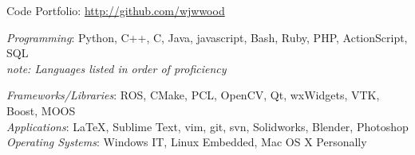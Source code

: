\documentclass[10pt]{article}
\renewcommand{\section}[2]%
        {\pagebreak[2]\vspace{1.3\baselineskip}%
         \phantomsection\addcontentsline{toc}{section}{#1}%
         \hspace{0in}%
         \marginpar{
         \raggedright \scshape #1}#2}
\newcommand{\blankline}{\quad\pagebreak[2]}
\begin{document}
Code Portfolio: \href{http://github.com/wjwwood}{http://github.com/wjwwood}

\blankline

\textit{Programming}: Python, C++, C, Java, javascript, Bash, Ruby, PHP, ActionScript, SQL \\
\null \hfill \textit{note: Languages listed in order of proficiency}

\textit{Frameworks/Libraries}: ROS, CMake, PCL, OpenCV, Qt, wxWidgets, VTK, Boost, MOOS \\


\textit{Applications}: \LaTeX{}, Sublime Text, vim, git, svn, Solidworks, Blender, Photoshop \\


\textit{Operating Systems}: Windows IT, Linux Embedded, Mac OS X Personally


\end{document}
